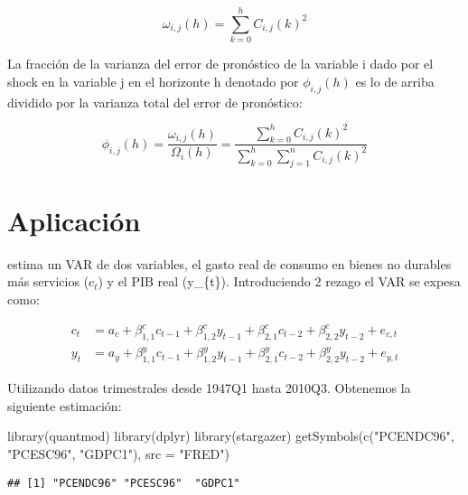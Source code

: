 \documentclass[
]{book}
\newenvironment{Shaded}{\begin{snugshade}}{\end{snugshade}}
\newcommand{\AttributeTok}[1]{\textcolor[rgb]{0.77,0.63,0.00}{#1}}
\newcommand{\FunctionTok}[1]{\textcolor[rgb]{0.00,0.00,0.00}{#1}}
\newcommand{\NormalTok}[1]{#1}
\newcommand{\StringTok}[1]{\textcolor[rgb]{0.31,0.60,0.02}{#1}}
\begin{document}
\begin{equation}
\omega_{i, j}(h)=\sum_{k=0}^{h} C_{i,j}(k)^{2}
\end{equation}

La fracción de la varianza del error de pronóstico de la variable i dado por el shock en la variable j en el horizonte h denotado por \(\phi_{i,j}(h)\) es lo de arriba dividido por la varianza total del error de pronóstico:

\begin{equation}
\phi_{i,j}(h)=\frac{\omega_{i, j}(h)}{\Omega_{i}(h)}=\frac{\sum_{k=0}^{h} C_{i,j}(k)^{2}}{\sum_{k=0}^{h} \sum_{j=1}^{n}C_{i,j}(k)^{2}}
\end{equation}

\hypertarget{aplicaciuxf3n}{%
\section{Aplicación}\label{aplicaciuxf3n}}

\citet{Cochrane94} estima un VAR de dos variables, el gasto real de consumo en bienes no durables más servicios (\(c_{t}\)) y el PIB real (y\_\{t\}). Introduciendo 2 rezago el VAR se expesa como:

\begin{align}
c_{t}&= a_{c}+\beta_{1,1}^{c}c_{t-1}+\beta_{1,2}^{c}y_{t-1}+\beta_{2,1}^{c}c_{t-2}+\beta_{2,2}^{c}y_{t-2}+e_{c,t}\\
y_{t}&= a_{y}+\beta_{1,1}^{y}c_{t-1}+\beta_{1,2}^{y}y_{t-1}+\beta_{2,1}^{y}c_{t-2}+\beta_{2,2}^{y}y_{t-2}+e_{y,t}
\end{align}

Utilizando datos trimestrales desde 1947Q1 hasta 2010Q3. Obtenemos la siguiente estimación:

\begin{Shaded}
\begin{Highlighting}[]
\FunctionTok{library}\NormalTok{(quantmod)}
\FunctionTok{library}\NormalTok{(dplyr)}
\FunctionTok{library}\NormalTok{(stargazer)}
\FunctionTok{getSymbols}\NormalTok{(}\FunctionTok{c}\NormalTok{(}\StringTok{"PCENDC96"}\NormalTok{, }\StringTok{"PCESC96"}\NormalTok{, }\StringTok{"GDPC1"}\NormalTok{),}
           \AttributeTok{src =} \StringTok{"FRED"}\NormalTok{)}
\end{Highlighting}
\end{Shaded}

\begin{verbatim}
## [1] "PCENDC96" "PCESC96"  "GDPC1"
\end{verbatim}
\end{document}
